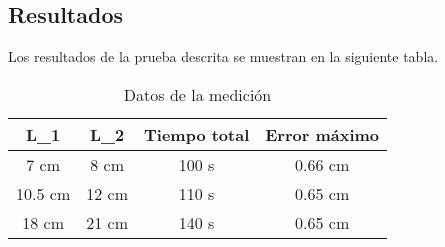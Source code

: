 \subsection{Resultados}

Los resultados de la prueba descrita se muestran en la siguiente tabla.

\begin{table}[ht]
	\centering
	\begin{tabular}{|c|c|c|c|}
		\hline
		\textbf{L\_1} & \textbf{L\_2} & \textbf{Tiempo total} & \textbf{Error máximo} \\
		\hline
		7 cm  & 8 cm  & 100 s & 0.66 cm \\
		10.5 cm & 12 cm & 110 s & 0.65 cm \\
		18 cm  & 21 cm & 140 s & 0.65 cm \\
		\hline
	\end{tabular}
	\caption{Datos de la medición}
\end{table}